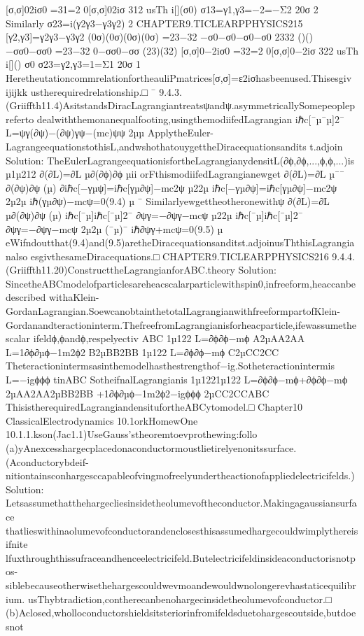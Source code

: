 {{{{{{{{{{{[σ,σ]02iσ0
=31=2
0[σ,σ]02iσ
312
usTh
i[](σ0)
σ13=γ1,γ3=−2=−Σ2
20σ
2
Similarly
σ23=i(γ2γ3−γ3γ2)
2
CHAPTER9.TICLEARPPHYSICS215
[γ2,γ3]=γ2γ3−γ3γ2
(0σ)(0σ)(0σ)(0σ)
=23−32
−σ0−σ0−σ0−σ0
2332
()()
−σσ0−σσ0
=23−32
0−σσ0−σσ
(23)(32)
[σ,σ]0−2iσ0
=32=2
0[σ,σ]0−2iσ
322
usTh
i[]()
σ0
σ23=γ2,γ3=1=Σ1
20σ
1
HeretheutationcommrelationfortheauliPmatrices[σ,σ]=ε2iσhasbeenused.Thisesgiv
ijijkk
ustherequiredrelationship.□
¯
9.4.3.(Griiffth11.4)AsitstandsDiracLagrangiantreatsψandψ.asymmetricallySomepeoplepreferto
dealwiththemonanequalfooting,usingthemodiifedLagrangian
iℏc[¯µ¯µ]2¯
L=ψγ(∂ψ)−(∂ψ)γψ−(mc)ψψ
2µµ
ApplytheEuler-LagrangeequationstothisL,andwshothatouygettheDiracequationsandits
t.adjoin
Solution:
TheEulerLagrangeequationisfortheLagrangianydensitL(∂ϕ,∂ϕ,...,ϕ,ϕ,...)is
µ1µ212
∂(∂L)=∂L
µ∂(∂ϕ)∂ϕ
µii
orFthismodiifedLagrangianewget
∂(∂L)=∂L
µ¯¯
∂(∂ψ)∂ψ
(µ)
∂iℏc[−γµψ]=iℏc[γµ∂ψ]−mc2ψ
µ22µ
iℏc[−γµ∂ψ]=iℏc[γµ∂ψ]−mc2ψ
2µ2µ
iℏ(γµ∂ψ)−mcψ=0(9.4)
µ
¯
Similarlyewgettheotheronewithψ
∂(∂L)=∂L
µ∂(∂ψ)∂ψ
(µ)
iℏc[¯µ]iℏc[¯µ]2¯
∂ψγ=−∂ψγ−mcψ
µ22µ
iℏc[¯µ]iℏc[¯µ]2¯
∂ψγ=−∂ψγ−mcψ
2µ2µ
(¯µ)¯
iℏ∂ψγ+mcψ=0(9.5)
µ
eWifndoutthat(9.4)and(9.5)aretheDiracequationsanditst.adjoinusThthisLagrangianalso
esgivthesameDiracequations.□
CHAPTER9.TICLEARPPHYSICS216
9.4.4.(Griiffth11.20)ConstructtheLagrangianforABC.theory
Solution:
SincetheABCmodelofparticlesareheacscalarparticlewithspin0,infreeform,heaccanbedescribed
withaKlein-GordanLagrangian.SoewcanobtainthetotalLagrangianwithfreeformpartofKlein-
Gordanandteractioninterm.ThefreefromLagrangianisforheacparticle,ifewassumethescalar
ifeldϕ,ϕandϕ,respelyectiv
ABC
1µ122
L=∂ϕ∂ϕ−mϕ
A2µAA2AA
L=1∂ϕ∂µϕ−1m2ϕ2
B2µBB2BB
1µ122
L=∂ϕ∂ϕ−mϕ
C2µCC2CC
Theteractionintermsasinthemodelhasthestrengthof−ig.Sotheteractionintermis
L=−igϕϕϕ
tinABC
SotheifnalLagrangianis
1µ1221µ122
L=∂ϕ∂ϕ−mϕ+∂ϕ∂ϕ−mϕ
2µAA2AA2µBB2BB
+1∂ϕ∂µϕ−1m2ϕ2−igϕϕϕ
2µCC2CCABC
ThisistherequiredLagrangiandensitufortheABCytomodel.□
Chapter10
ClassicalElectrodynamics
10.1orkHomewOne
10.1.1.kson(Jac1.1)UseGauss’stheoremtoevprothewing:follo
(a)yAnexcesshargecplacedonaconductormoustlietirelyenonitssurface.(Aconductorybdeif-
nitiontainsconhargesccapableofvingmofreelyundertheactionofappliedelectricifelds.)
Solution:
Letsassumethatthehargecliesinsidetheolumevoftheconductor.Makingagaussiansurface
thatlieswithinaolumevofconductorandenclosesthisassumedhargecouldwimplythereisifnite
lfuxthroughthissufraceandhenceelectricifeld.Butelectricifeldinsideaconductorisnotpos-
siblebecauseotherwisethehargescouldwevmoandewouldwnolongerevhastaticequilibrium.
usThybtradiction,contherecanbenohargecinsidetheolumevofconductor.□
(b)Aclosed,wholloconductorshieldsitsteriorinfromifeldsduetohargescoutside,butdoesnot
}}}}}}}}}}}
